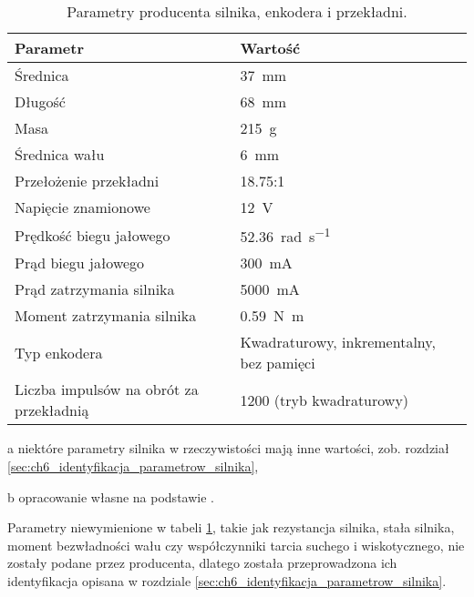 \begin{table}[H]
    \centering
    \begin{threeparttable}
        \caption{Parametry producenta silnika, enkodera i przekładni.}
        \label{tab:parametry_silnika}
        
        \begin{tabularx}{0.9\textwidth}{l | l}
            \toprule
            Parametr & Wartość \\
            \midrule
            Średnica & \SI{37}{\milli\meter} \\
            Długość & \SI{68}{\milli\meter} \\
            Masa & \SI{215}{g} \\
            Średnica wału & \SI{6}{\milli\meter} \\
            \midrule
            Przełożenie przekładni & \num{18,75}:\num{1} \\
            \midrule
            Napięcie znamionowe & \SI{12}{\volt} \\
            Prędkość biegu jałowego & \SI{52,36}{\radian\per\second} \\
            Prąd biegu jałowego & \SI{300}{\milli\ampere} \\
            Prąd zatrzymania silnika & \SI{5000}{\milli\ampere} \\
            Moment zatrzymania silnika & \SI{0,59}{\newton\meter} \\
            \midrule
            Typ enkodera & Kwadraturowy, inkrementalny, bez pamięci \\
            Liczba impulsów na obrót za przekładnią & \num{1200} (tryb kwadraturowy) \\
            \bottomrule
        \end{tabularx}
        
        \begin{tablenotes}
            \footnotesize
            \item[a] niektóre parametry silnika w rzeczywistości mają inne wartości, zob. rozdział \ref{sec:ch6_identyfikacja_parametrow_silnika},
            \item[b] opracowanie własne na podstawie \cite{SILNIK_MANUAL}.
        \end{tablenotes}
    \end{threeparttable}
\end{table}

Parametry niewymienione w tabeli \ref{tab:parametry_silnika}, takie jak rezystancja silnika, stała silnika, moment bezwładności wału czy współczynniki tarcia suchego i wiskotycznego, nie zostały podane przez producenta, dlatego została przeprowadzona ich identyfikacja opisana w rozdziale \ref{sec:ch6_identyfikacja_parametrow_silnika}.

